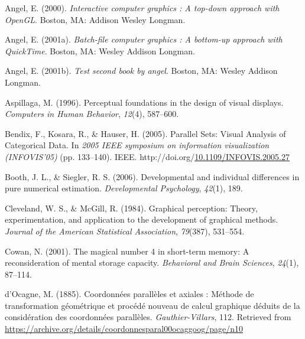 \documentclass[print]{nuthesis}
\newlength{\cslhangindent}
\newenvironment{CSLReferences}[2]%
{\setlength{\parindent}{0pt}%
\everypar{\setlength{\hangindent}{\cslhangindent}}\ignorespaces}%
{\par}
\begin{document}
\hypertarget{refs}{}
\begin{CSLReferences}{1}{0}
\leavevmode{}%
Angel, E. (2000). \emph{Interactive computer graphics : A top-down approach with OpenGL}. Boston, MA: Addison Wesley Longman.

\leavevmode{}%
Angel, E. (2001a). \emph{Batch-file computer graphics : A bottom-up approach with QuickTime}. Boston, MA: Wesley Addison Longman.

\leavevmode{}%
Angel, E. (2001b). \emph{Test second book by angel}. Boston, MA: Wesley Addison Longman.

\leavevmode{}%
Aspillaga, M. (1996). Perceptual foundations in the design of visual displays. \emph{Computers in Human Behavior}, \emph{12}(4), 587--600.

\leavevmode{}%
Bendix, F., Kosara, R., \& Hauser, H. (2005). {Parallel Sets: Visual Analysis of Categorical Data}. In \emph{2005 IEEE symposium on information visualization (INFOVIS'05)} (pp. 133--140). IEEE. http://doi.org/\href{https://doi.org/10.1109/INFOVIS.2005.27}{10.1109/INFOVIS.2005.27}

\leavevmode{}%
Booth, J. L., \& Siegler, R. S. (2006). Developmental and individual differences in pure numerical estimation. \emph{Developmental Psychology}, \emph{42}(1), 189.

\leavevmode{}%
Cleveland, W. S., \& McGill, R. (1984). Graphical perception: Theory, experimentation, and application to the development of graphical methods. \emph{Journal of the American Statistical Association}, \emph{79}(387), 531--554.

\leavevmode{}%
Cowan, N. (2001). The magical number 4 in short-term memory: A reconsideration of mental storage capacity. \emph{Behavioral and Brain Sciences}, \emph{24}(1), 87--114.

\leavevmode{}%
d'Ocagne, M. (1885). {Coordonnées parallèles et axiales : Méthode de transformation géométrique et procédé nouveau de calcul graphique déduits de la considération des coordonnées parallèles}. \emph{Gauthier-Villars}, 112. Retrieved from \url{https://archive.org/details/coordonnesparal00ocaggoog/page/n10}


\end{CSLReferences}
\end{document}
